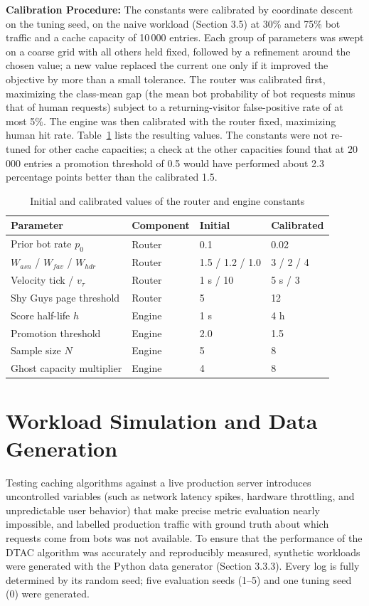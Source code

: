 \textbf{Calibration Procedure:}
The constants were calibrated by coordinate descent on the tuning seed, on the naive workload (Section 3.5) at 30\% and 75\% bot traffic and a cache capacity of 10\,000 entries. Each group of parameters was swept on a coarse grid with all others held fixed, followed by a refinement around the chosen value; a new value replaced the current one only if it improved the objective by more than a small tolerance. The router was calibrated first, maximizing the class-mean gap (the mean bot probability of bot requests minus that of human requests) subject to a returning-visitor false-positive rate of at most 5\%. The engine was then calibrated with the router fixed, maximizing human hit rate. Table~\ref{tab:calibration} lists the resulting values. The constants were not re-tuned for other cache capacities; a check at the other capacities found that at 20\,000 entries a promotion threshold of 0.5 would have performed about 2.3 percentage points better than the calibrated 1.5.

\begin{table}[htbp]
    \centering
    \caption{Initial and calibrated values of the router and engine constants}
    \label{tab:calibration}
    \begin{tabular}{llll}
        \toprule
        Parameter & Component & Initial & Calibrated \\
        \midrule
        Prior bot rate $p_0$ & Router & 0.1 & 0.02 \\
        $W_{asn}$ / $W_{fav}$ / $W_{hdr}$ & Router & 1.5 / 1.2 / 1.0 & 3 / 2 / 4 \\
        Velocity tick / $v_{\tau}$ & Router & 1 s / 10 & 5 s / 3 \\
        Shy Guys page threshold & Router & 5 & 12 \\
        Score half-life $h$ & Engine & 1 s & 4 h \\
        Promotion threshold & Engine & 2.0 & 1.5 \\
        Sample size $N$ & Engine & 5 & 8 \\
        Ghost capacity multiplier & Engine & 4 & 8 \\
        \bottomrule
    \end{tabular}
\end{table}

\section{Workload Simulation and Data Generation}
Testing caching algorithms against a live production server introduces uncontrolled variables (such as network latency spikes, hardware throttling, and unpredictable user behavior) that make precise metric evaluation nearly impossible, and labelled production traffic with ground truth about which requests come from bots was not available. To ensure that the performance of the DTAC algorithm was accurately and reproducibly measured, synthetic workloads were generated with the Python data generator (Section 3.3.3). Every log is fully determined by its random seed; five evaluation seeds (1--5) and one tuning seed (0) were generated.

